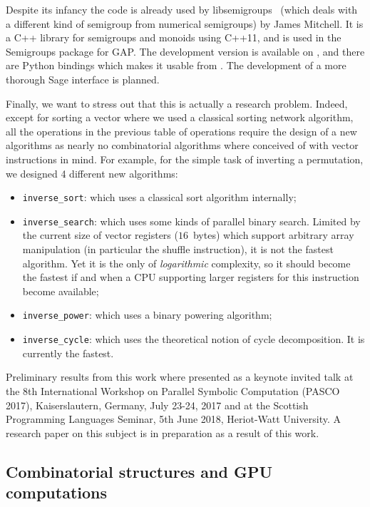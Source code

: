 \documentclass{deliverablereport}
\begin{document}
Despite its infancy the code is already used by
libsemigroups~\cite{libsemigroups} (which deals with a different kind of
semigroup from numerical semigroups) by James Mitchell. It is a C++ library
for semigroups and monoids using C++11, and is used in the Semigroups package
for GAP. The development version is available on \GitHub, and there are Python
bindings which makes it usable from \Sage. The development of a more thorough
Sage interface is planned.  \bigskip

Finally, we want to stress out that this is actually a research
problem. Indeed, except for sorting a vector where we used a classical sorting
network algorithm, all the operations in the previous table of operations
require the design of a new algorithms as nearly no combinatorial algorithms
where conceived of with vector instructions in mind. For example, for the
simple task of inverting a permutation, we designed 4 different new
algorithms:
\begin{itemize}
\item \verb|inverse_sort|: which uses a classical sort algorithm internally;
\item \verb|inverse_search|: which uses some kinds of parallel binary
  search. Limited by the current size of vector registers ($16$~bytes) which support
  arbitrary array manipulation (in particular the shuffle instruction), it is
  not the fastest algorithm. Yet it is the only of {\em logarithmic} complexity,
  so it should become the fastest if and when a CPU supporting larger registers
  for this instruction become available;
\item \verb|inverse_power|: which uses a binary powering algorithm;
\item \verb|inverse_cycle|: which uses the theoretical notion of cycle
  decomposition. It is currently the fastest.
\end{itemize}
Preliminary results from this work where presented as a keynote invited talk at
the 8th International Workshop on Parallel Symbolic Computation (PASCO 2017),
Kaiserslautern, Germany, July 23-24, 2017 and at the Scottish Programming
Languages Seminar, 5th June 2018, Heriot-Watt University. A research paper on
this subject is in preparation as a result of this work.

\subsection{Combinatorial structures and GPU computations}
\end{document}
